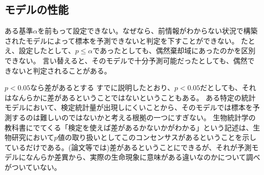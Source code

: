 \subsection{モデルの性能}
ある基準$\alpha$を前もって設定できない。なぜなら、前情報がわからない状況で構築されたモデルによって標本を予測できないと判定を下すことができない。
たとえ、設定したとして、$p \leq \alpha$であったとしても、偶然棄却域にあったのかを区別できない。
言い替えると、そのモデルで十分予測可能だったとしても、偶然できないと判定されることがある。



\begin{SMbox}{$p<0.05$なら差があるとする}
 すでに説明したとおり、$p<0.05$だとしても、それはなんらかに差があるということではないということもある。 ある特定の統計モデルにおいて、検定統計量が出現しにくいことから、そのモデルでは標本を予測するのは難しいのではないかと考える根拠の一つにすぎない。 生物統計学の教科書にでてくる「検定を使えば差があるかないかがわかる」という記述は、生物研究において$p$値の取り扱いとしてこのコンセンサスがあるということを示しているだけである。(論文等では)差があるということにできるが、それが予測モデルになんらか差異から、実際の生命現象に意味がある違いなのかについて調べがついていない。
\end{SMbox}

